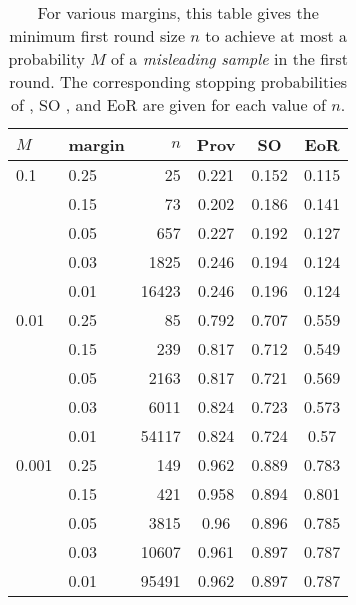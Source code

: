 \begin{table}[h!]
\center
\begin{tabular}{ |l|l|r|c|c|c| }
\hline
$M$ & margin & $n$ & Prov & SO & EoR \\
\hline
0.1&0.25&25&0.221&0.152&0.115\\
&0.15&73&0.202&0.186&0.141\\
&0.05&657&0.227&0.192&0.127\\
&0.03&1825&0.246&0.194&0.124\\
&0.01&16423&0.246&0.196&0.124\\
\hline
0.01&0.25&85&0.792&0.707&0.559\\
&0.15&239&0.817&0.712&0.549\\
&0.05&2163&0.817&0.721&0.569\\
&0.03&6011&0.824&0.723&0.573\\
&0.01&54117&0.824&0.724&0.57\\
\hline
0.001&0.25&149&0.962&0.889&0.783\\
&0.15&421&0.958&0.894&0.801\\
&0.05&3815&0.96&0.896&0.785\\
&0.03&10607&0.961&0.897&0.787\\
&0.01&95491&0.962&0.897&0.787\\
\hline
\end{tabular}
\caption{For various margins, this table gives the minimum first round size $n$ to achieve at most a probability $M$ of a \emph{misleading sample} in the first round. The corresponding stopping probabilities of \Providence, SO \BRAVO, and EoR \BRAVO are given for each value of $n$.}
\label{tab:misleading}
\end{table}



